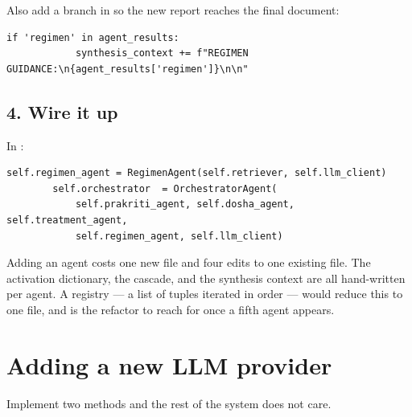 Also add a branch in  so the new report reaches the final document:

\begin{lstlisting}[style=py]
        if 'regimen' in agent_results:
            synthesis_context += f"REGIMEN GUIDANCE:\n{agent_results['regimen']}\n\n"
\end{lstlisting}

\subsection{4. Wire it up}

In :

\begin{lstlisting}[style=py]
        self.regimen_agent = RegimenAgent(self.retriever, self.llm_client)
        self.orchestrator  = OrchestratorAgent(
            self.prakriti_agent, self.dosha_agent, self.treatment_agent,
            self.regimen_agent, self.llm_client)
\end{lstlisting}

\begin{note}[title={The orchestrator is the friction point}]
Adding an agent costs one new file and four edits to one existing file. The activation dictionary, the cascade, and the synthesis context are all hand-written per agent. A registry --- a list of  tuples iterated in order --- would reduce this to one file, and is the refactor to reach for once a fifth agent appears.
\end{note}

\section{Adding a new LLM provider}

Implement two methods and the rest of the system does not care.

